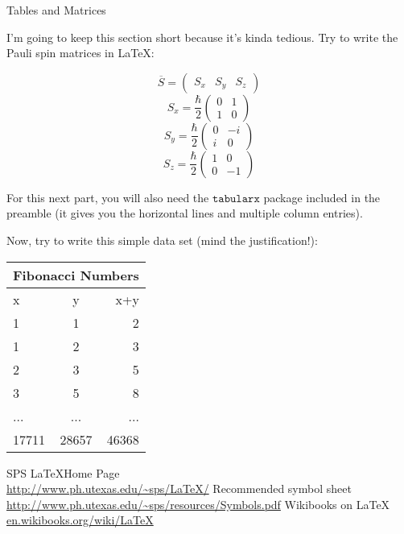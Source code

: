 \documentclass{article}
\begin{document}
\begin{section}{Tables and Matrices}

I'm going to keep this section short because it's kinda tedious. Try to write the Pauli spin matrices in \LaTeX:

\Large
\begin{equation}
	\overline{S}=\left(\begin{array}{ccc}
		S_x & S_y & S_z \end{array} \right)
\end{equation}
\begin{equation}
		S_x=\frac{\hbar}{2} \left( \begin{array}{cc}
		0 & 1 \\
		1 & 0 \end{array}\right)
\end{equation}
\begin{equation}
	S_y=\frac{\hbar}{2} \left( \begin{array}{cc}
		0 & -i \\
		i & 0 \end{array} \right)
\end{equation}
\begin{equation}
	S_z=\frac{\hbar}{2}\left(\begin{array}{cc}
		1 & 0 \\
		0 & -1 \end{array}\right)
\end{equation}

\normalsize
For this next part, you will also need the $\texttt{tabularx}$ package included in the preamble (it gives you the horizontal lines and multiple column entries).

Now, try to write this simple data set (mind the justification!):

\Huge

\begin{tabular}{ l | c || r}
\multicolumn{3}{c}{Fibonacci Numbers}\\
\hline 
x & y & x+y \\ 
\hline
1 & 1 & 2 \\
1 & 2 & 3 \\
2 & 3 & 5 \\
3 & 5 & 8 \\
... & ... & ... \\
\hline
17711 & 28657 & 46368 
\end{tabular}
\end{section}
\normalsize

\begin{thebibliography}{9}
	SPS \LaTeX Home Page \\
	\url{http://www.ph.utexas.edu/~sps/LaTeX/}
	Recommended symbol sheet \\
	\url{http://www.ph.utexas.edu/~sps/resources/Symbols.pdf}
	Wikibooks on \LaTeX \\
	\url{en.wikibooks.org/wiki/LaTeX}
\end{thebibliography}
\end{document}
